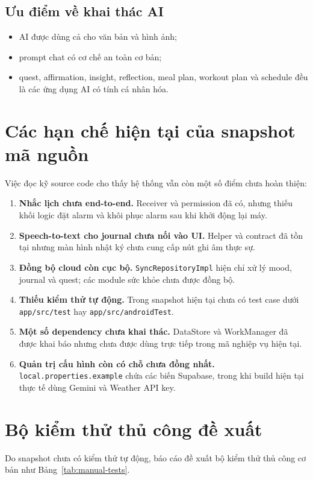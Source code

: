 \documentclass{zenbuddy-report}
\begin{document}
\subsection{Ưu điểm về khai thác AI}
\begin{itemize}
  \item AI được dùng cả cho văn bản và hình ảnh;
  \item prompt chat có cơ chế an toàn cơ bản;
  \item quest, affirmation, insight, reflection, meal plan, workout plan và schedule đều là các ứng dụng AI có tính cá nhân hóa.
\end{itemize}

\section{Các hạn chế hiện tại của snapshot mã nguồn}
Việc đọc kỹ source code cho thấy hệ thống vẫn còn một số điểm chưa hoàn thiện:
\begin{enumerate}
  \item \textbf{Nhắc lịch chưa end-to-end.} Receiver và permission đã có, nhưng thiếu khối logic đặt alarm và khôi phục alarm sau khi khởi động lại máy.
  \item \textbf{Speech-to-text cho journal chưa nối vào UI.} Helper và contract đã tồn tại nhưng màn hình nhật ký chưa cung cấp nút ghi âm thực sự.
  \item \textbf{Đồng bộ cloud còn cục bộ.} \texttt{SyncRepositoryImpl} hiện chỉ xử lý mood, journal và quest; các module sức khỏe chưa được đồng bộ.
  \item \textbf{Thiếu kiểm thử tự động.} Trong snapshot hiện tại chưa có test case dưới \texttt{app/src/test} hay \texttt{app/src/androidTest}.
  \item \textbf{Một số dependency chưa khai thác.} DataStore và WorkManager đã được khai báo nhưng chưa được dùng trực tiếp trong mã nghiệp vụ hiện tại.
  \item \textbf{Quản trị cấu hình còn có chỗ chưa đồng nhất.} \texttt{local.properties.example} chứa các biến Supabase, trong khi build hiện tại thực tế dùng Gemini và Weather API key.
\end{enumerate}

\section{Bộ kiểm thử thủ công đề xuất}
Do snapshot chưa có kiểm thử tự động, báo cáo đề xuất bộ kiểm thử thủ công cơ bản như Bảng~\ref{tab:manual-tests}.
\end{document}
